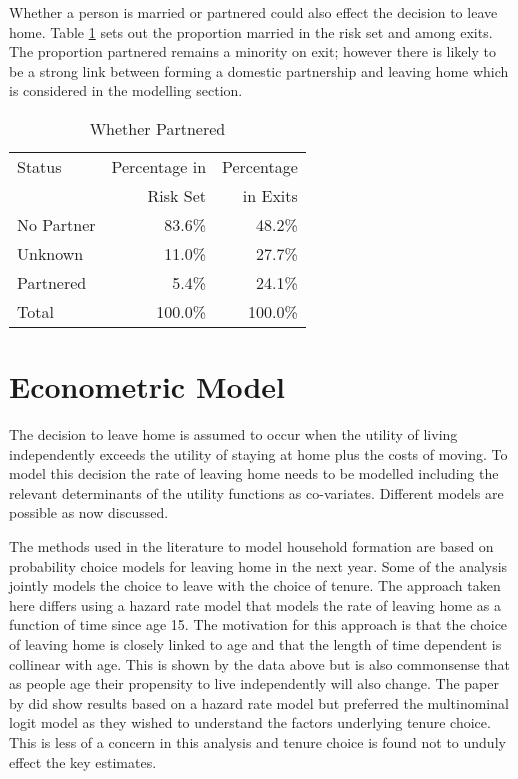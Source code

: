 \documentclass[12pt]{article}
\begin{document}
Whether a person is married or partnered could also effect the decision to leave home. Table \ref{marriedTab} sets out the proportion married in the risk set and among exits. The proportion partnered remains a minority on exit; however there is likely to be a strong link between forming a domestic partnership and leaving home which is considered in the modelling section.

\begin{table}[htpb]
\centering
\caption{Whether Partnered}
\label{marriedTab}
\begin{tabular}{lrr}
\toprule
Status & Percentage in & Percentage \\
 & Risk Set & in Exits \\
\midrule
No Partner &  83.6\% &  48.2\% \\
  Unknown &  11.0\% &  27.7\% \\
  Partnered &   5.4\% &  24.1\% \\
  Total & 100.0\% & 100.0\% \\
\bottomrule
\end{tabular}
\end{table}


\section{Econometric Model}

The decision to leave home is assumed to occur when the utility of living independently exceeds the utility of staying at home plus the costs of moving. To model this decision the rate of leaving home needs to be modelled including the relevant determinants of the utility functions as co-variates. Different models are possible as now discussed.

The methods used in the literature to model household formation are based on probability choice models for leaving home in the next year. Some of the analysis jointly models the choice to leave with the choice of tenure. The approach taken here differs using a hazard rate model that models the rate of leaving home as a function of time since age 15. The motivation for this approach is that the choice of leaving home is closely linked to age and that the length of time dependent is collinear with age. This is shown by the data above but is also commonsense that as people age their propensity to live independently will also change. The paper by \cite{lee2013happens} did show results based on a hazard rate model but preferred the multinominal logit model as they wished to understand the factors underlying tenure choice. This is less of a concern in this analysis and tenure choice is found not to unduly effect the key estimates.
\end{document}
